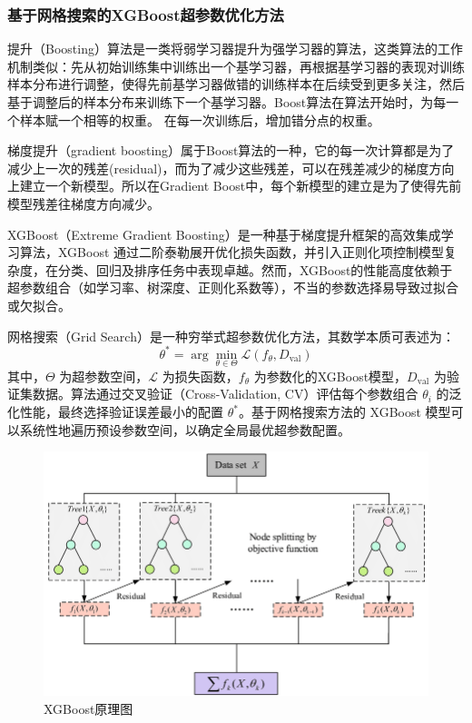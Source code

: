 \documentclass{MMCStyle}
\begin{document}
\subsubsection{基于网格搜索的XGBoost超参数优化方法}
提升（Boosting）算法是一类将弱学习器提升为强学习器的算法，这类算法的工作机制类似：先从初始训练集中训练出一个基学习器，再根据基学习器的表现对训练样本分布进行调整，使得先前基学习器做错的训练样本在后续受到更多关注，然后基于调整后的样本分布来训练下一个基学习器。Boost算法在算法开始时，为每一个样本赋一个相等的权重。 在每一次训练后，增加错分点的权重。

梯度提升（gradient boosting）属于Boost算法的一种，它的每一次计算都是为了减少上一次的残差(residual)，而为了减少这些残差，可以在残差减少的梯度方向上建立一个新模型。所以在Gradient Boost中，每个新模型的建立是为了使得先前模型残差往梯度方向减少。

XGBoost（Extreme Gradient Boosting）是一种基于梯度提升框架的高效集成学习算法，XGBoost 通过二阶泰勒展开优化损失函数，并引入正则化项控制模型复杂度，在分类、回归及排序任务中表现卓越。然而，XGBoost的性能高度依赖于超参数组合（如学习率、树深度、正则化系数等），不当的参数选择易导致过拟合或欠拟合。

网格搜索（Grid Search）是一种穷举式超参数优化方法，其数学本质可表述为：
\begin{equation}
    \theta^* = \arg \min_{\theta \in \Theta} \mathcal{L}(f_{\theta}, D_{\text{val}})
\end{equation}
其中，\(\Theta\) 为超参数空间，\(\mathcal{L}\) 为损失函数，\(f_{\theta}\) 为参数化的XGBoost模型，\(D_{\text{val}}\) 为验证集数据。算法通过交叉验证（Cross-Validation, CV）评估每个参数组合 \(\theta_i\) 的泛化性能，最终选择验证误差最小的配置 \(\theta^*\)。基于网格搜索方法的 XGBoost 模型可以系统性地遍历预设参数空间，以确定全局最优超参数配置。

\begin{figure}[htb]
	\centering
	\includegraphics[width=0.8\linewidth]{XGBoost.png}
	\caption{XGBoost原理图}
	\label{fig:6}
\end{figure}
\end{document}
